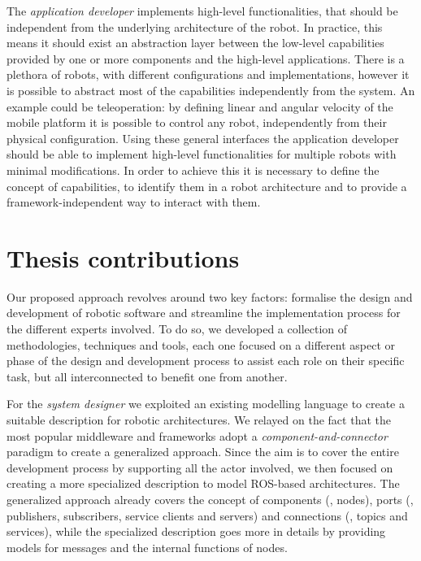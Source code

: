 The \textit{application developer} implements high-level functionalities, that should be independent from the underlying architecture of the robot. In practice, this means it should exist an abstraction layer between the low-level capabilities provided by one or more components and the high-level applications. There is a plethora of robots, with different configurations and implementations, however it is possible to abstract most of the capabilities independently from the system. An example could be teleoperation: by defining linear and angular velocity of the mobile platform it is possible to control any robot, independently from their physical configuration. Using these general interfaces the application developer should be able to implement high-level functionalities for multiple robots with minimal modifications. In order to achieve this it is necessary to define the concept of capabilities, to identify them in a robot architecture and to provide a framework-independent way to interact with them.

\section{Thesis contributions}
Our proposed approach revolves around two key factors: formalise the design and development of robotic software and streamline the implementation process for the different experts involved. To do so, we developed a collection of methodologies, techniques and tools, each one focused on a different aspect or phase of the design and development process to assist each role on their specific task, but all interconnected to benefit one from another.

For the \textit{system designer} we exploited an existing modelling language to create a suitable description for robotic architectures. We relayed on the fact that the most popular middleware and frameworks adopt a \textit{component-and-connector} paradigm to create a generalized approach. Since the aim is to cover the entire development process by supporting all the actor involved, we then focused on creating a more specialized description to model ROS-based architectures. The generalized approach already covers the concept of components (\ie, nodes), ports (\ie, publishers, subscribers, service clients and servers) and connections (\ie, topics and services), while the specialized description goes more in details by providing models for messages and the internal functions of nodes. 


